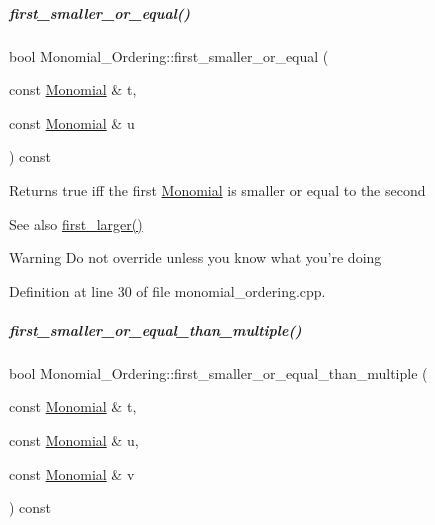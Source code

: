\mbox{\label{group__orderinggroup_ac9234fccc26cca2aee57e28af7b61880}} 
\subparagraph{\texorpdfstring{first\+\_\+smaller\+\_\+or\+\_\+equal()}{first\_smaller\_or\_equal()}}
{\footnotesize\ttfamily bool Monomial\+\_\+\+Ordering\+::first\+\_\+smaller\+\_\+or\+\_\+equal (\begin{DoxyParamCaption}\item[{const \hyperlink{group__polygroup_class_monomial}{Monomial} \&}]{t,  }\item[{const \hyperlink{group__polygroup_class_monomial}{Monomial} \&}]{u }\end{DoxyParamCaption}) const}

\begin{DoxyReturn}{Returns}
{\ttfamily true} iff the first \hyperlink{group__polygroup_class_monomial}{Monomial} is smaller or equal to the second 
\end{DoxyReturn}
\begin{DoxySeeAlso}{See also}
\hyperlink{group__orderinggroup_aed41fe82e1ca5cd287a93d287fee7c20}{first\+\_\+larger()} 
\end{DoxySeeAlso}
\begin{DoxyWarning}{Warning}
Do not override unless you know what you're doing 
\end{DoxyWarning}


Definition at line 30 of file monomial\+\_\+ordering.\+cpp.

\mbox{\label{group__orderinggroup_a0ed5bf2b1da5daaa67aaba00f8c6cbd0}} 
\subparagraph{\texorpdfstring{first\+\_\+smaller\+\_\+or\+\_\+equal\+\_\+than\+\_\+multiple()}{first\_smaller\_or\_equal\_than\_multiple()}}
{\footnotesize\ttfamily bool Monomial\+\_\+\+Ordering\+::first\+\_\+smaller\+\_\+or\+\_\+equal\+\_\+than\+\_\+multiple (\begin{DoxyParamCaption}\item[{const \hyperlink{group__polygroup_class_monomial}{Monomial} \&}]{t,  }\item[{const \hyperlink{group__polygroup_class_monomial}{Monomial} \&}]{u,  }\item[{const \hyperlink{group__polygroup_class_monomial}{Monomial} \&}]{v }\end{DoxyParamCaption}) const}

